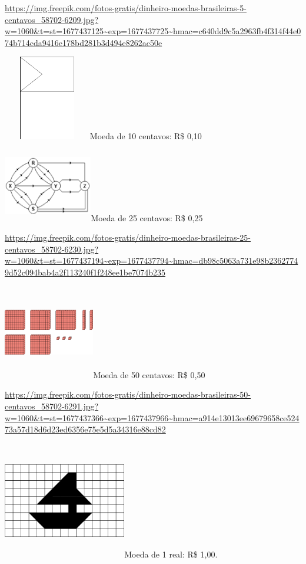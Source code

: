 \url{https://img.freepik.com/fotos-gratis/dinheiro-moedas-brasileiras-5-centavos_58702-6209.jpg?w=1060\&t=st=1677437125~exp=1677437725~hmac=c640dd9c5a2963fb4f314f44e074b714cda9416e178bd281b3d494e8262ac50e}

\includegraphics[width=1.50833in,height=1.45668in]{media/image74.png}Moeda
de 10 centavos: R\$ 0,10

\includegraphics[width=1.52500in,height=1.24749in]{media/image75.png}Moeda
de 25 centavos: R\$ 0,25

\url{https://img.freepik.com/fotos-gratis/dinheiro-moedas-brasileiras-25-centavos_58702-6230.jpg?w=1060\&t=st=1677437194~exp=1677437794~hmac=db98c5063a731e98b23627749d52c094bab4a2f113240f1f248ee1be7074b235}

\includegraphics[width=1.56667in,height=1.61849in]{media/image76.png}Moeda
de 50 centavos: R\$ 0,50

\url{https://img.freepik.com/fotos-gratis/dinheiro-moedas-brasileiras-50-centavos_58702-6291.jpg?w=1060\&t=st=1677437366~exp=1677437966~hmac=a914e13013ee69679658ce52473a57d18d6d23ed6356e75e5d5a34316e88cd82}

\includegraphics[width=2.11667in,height=2.01180in]{media/image77.png}Moeda
de 1 real: R\$ 1,00.

